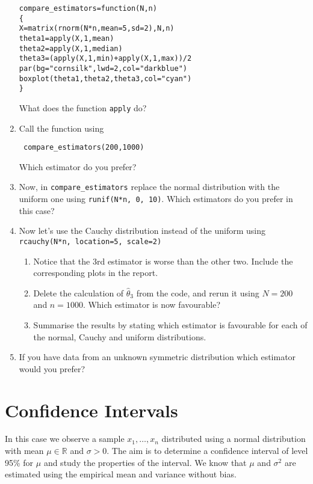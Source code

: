\documentclass[a4paper,10pt]{article}
\begin{document}
\begin{enumerate}
\begin{lstlisting}
compare_estimators=function(N,n)
{
X=matrix(rnorm(N*n,mean=5,sd=2),N,n)
theta1=apply(X,1,mean)
theta2=apply(X,1,median)
theta3=(apply(X,1,min)+apply(X,1,max))/2
par(bg="cornsilk",lwd=2,col="darkblue")
boxplot(theta1,theta2,theta3,col="cyan")
}
\end{lstlisting}
What does the function \texttt{apply} do? 


\item Call the function using 
\begin{lstlisting}
 compare_estimators(200,1000)
\end{lstlisting}
Which estimator do you prefer? 
\item Now, in \texttt{compare\_estimators} replace the normal distribution with the uniform one using \texttt{runif(N*n, 0, 10)}. Which estimators do you prefer in this case?  
\item Now let's use the Cauchy distribution instead of the uniform using \texttt{rcauchy(N*n, location=5, scale=2)}
\begin{enumerate}
\item Notice that the 3rd estimator is worse than the other two. Include the corresponding plots in the report. 
\item Delete the calculation of $\hat{\theta}_3$ from the code, and rerun it using $N=200$ and $n=1000$. Which estimator is now favourable? 
\item Summarise  the results by stating which estimator is favourable for each of the normal, Cauchy and uniform distributions. 
\end{enumerate}
\item If you have data from an unknown symmetric distribution which estimator would you prefer? 
\end{enumerate}

\section{Confidence Intervals} 

In this case we observe a sample $x_1, \ldots, x_n$ distributed using a normal distribution with mean $\mu \in \mathbb{R}$ and $\sigma > 0$. The aim is to determine a confidence interval of level 95\% for $\mu$ and study the properties of the interval. We know that $\mu$ and $\sigma^2$ are estimated using the empirical mean and variance without bias. 
\end{document}
